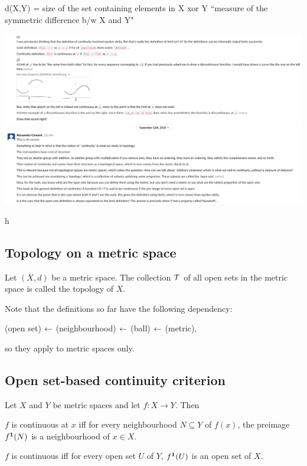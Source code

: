 d(X,Y) = size of the set containing elements in X xor Y “measure of the symmetric difference b/w X and Y" 



\includegraphics[width=400pt]{img/analysis--real-analysis--examples-58e8.png}

h
\subsection{Topology on a metric space}
\begin{definition}
  Let $(X, d)$ be a metric space. The collection $\mathcal T$ of all open sets in the metric space is
  called the topology of $X$.
\end{definition}

\begin{remark*}
  Note that the definitions so far have the following dependency:

  (open set) $\leftarrow$ (neighbourhood) $\leftarrow$ (ball) $\leftarrow$ (metric),

  so they apply to metric spaces only.
\end{remark*}

\subsection{Open set-based continuity criterion}
\begin{theorem}
  Let $X$ and $Y$ be metric spaces and let $f:X \to Y$. Then

  $f$ is continuous at $x$ iff for every neighbourhood $N \subseteq Y$ of $f(x)$, the preimage
  $f^{\mathbf 1}(N)$ is a neighbourhood of $x \in X$.

  $f$ is continuous iff for every open set $U$ of $Y$, $f^{\mathbf 1}(U)$ is an open set of $X$.
\end{theorem}

